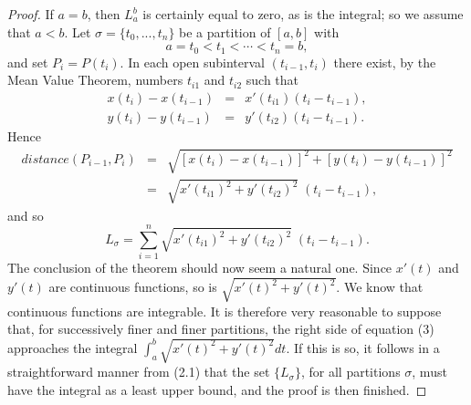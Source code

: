 \begin{proof}
If $a = b$, then $L_a^b$ is certainly equal to zero, as is the integral; so we assume that $a < b$. Let $\sigma = \{ t_0, . . ., t_n \}$ be a partition of $[a, b]$ with
$$
a = t_0 < t_1 <  \cdots < t_n = b,
$$
and set $P_i = P(t_i)$. In each open subinterval $(t_{i-1}, t_i)$ there exist, by the Mean Value Theorem, numbers $t_{i1}$ and $t_{i2}$ such that
\begin{eqnarray*}
x(t_i) - x(t_{i-1}) &=& x'(t_{i1})(t_i - t_{i-1}), \\
y(t_i) - y(t_{i-1}) &=& y'(t_{i2})(t_i - t_{i-1}).
\end{eqnarray*}
Hence
\begin{eqnarray*}
distance(P_{i-1}, P_i) 
&=& \sqrt {[x(t_i) - x(t_{i-1})]^2 + [y(t_i) - y(t_{i-1})]^2} \\
&=& \sqrt {x'(t_{i1})^2 + y'(t_{i2})^2} \;(t_i - t_{i-1}) ,
\end{eqnarray*}
and so
\begin{equation}
L_\sigma = \sum_{i=1}^n \sqrt {x'(t_{i1})^2 + y'(t_{i2})^2} \;(t_i - t_{i-1}). 
\label{eq10.2.3}
\end{equation}
The conclusion of the theorem should now seem a natural one. Since $x'(t)$ and $y'(t)$ are continuous functions, so is $\sqrt{x'(t)^2 + y'(t)^2}$. We know that continuous functions are integrable. It is therefore very reasonable to suppose that, for successively finer and finer partitions, the right side of equation (3) approaches the integral $\int_a^b \sqrt{x'(t)^2 + y'(t)^2} dt$. If this is so, it follows in a straightforward manner from (2.1) that the set $\{ L_\sigma \}$, for all partitions $\sigma$, must have the integral as a least upper bound, and the proof is then finished.


\end{proof}
